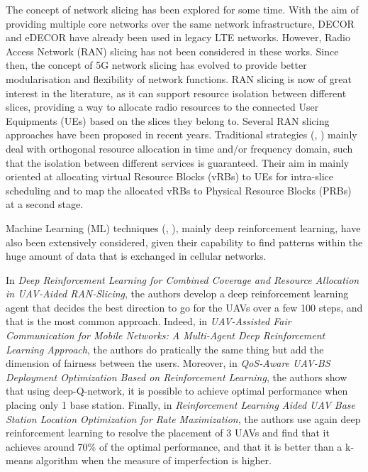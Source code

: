 \documentclass[letterpaper]{article}
\begin{document}
The concept of network slicing has been explored for some time. With the aim of providing multiple core networks over the same network infrastructure, DECOR and eDECOR \cite{decor} have already been used in legacy LTE networks. 
However, Radio Access Network (RAN) slicing has not been considered in these works.
Since then, the concept of 5G network slicing has evolved to provide better modularisation and flexibility of network functions.
RAN slicing is now of great interest in the literature, as it can support resource isolation between different slices, providing a way to allocate radio resources to the connected User Equipments (UEs) based on the slices they belong to. 
Several RAN slicing approaches have been proposed in recent years. 
Traditional strategies (\hspace{1sp}\cite{RANslicing1}, \cite{orion})  mainly deal with orthogonal resource allocation in time and/or frequency domain, such that the isolation between different services is guaranteed. Their aim in mainly oriented at allocating virtual Resource Blocks (vRBs) to UEs for intra-slice scheduling and to map the allocated vRBs to Physical Resource Blocks (PRBs) at a second stage.

Machine Learning (ML) techniques (\hspace{1sp}\cite{fairness}, \cite{main_article}), mainly deep reinforcement learning, have also been extensively considered, given their capability to find patterns within the huge amount of data that is exchanged in cellular networks.

In \textit{Deep Reinforcement Learning for Combined Coverage and Resource Allocation in UAV-Aided RAN-Slicing}\cite{main_article}, the authors develop a deep reinforcement learning agent that decides the best direction to go for the UAVs over a few 100 steps, and that is the most common approach.
Indeed, in \textit{UAV-Assisted Fair Communication for Mobile Networks: A Multi-Agent Deep Reinforcement Learning Approach}\cite{fairness}, the authors do pratically the same thing but add the dimension of fairness between the users.
Moreover, in \textit{QoS-Aware UAV-BS Deployment Optimization Based on Reinforcement Learning}\cite{deep-qn}, the authors show that using deep-Q-network, it is possible to achieve optimal performance when placing only 1 base station.
Finally, in \textit{Reinforcement Learning Aided UAV Base Station Location Optimization for Rate Maximization}\cite{rate_max}, the authors use again deep reinforcement learning to resolve the placement of 3 UAVs and find that it achieves around 70\% of the optimal performance, and that it is better than a k-means algorithm when the measure of imperfection is higher.
\end{document}

